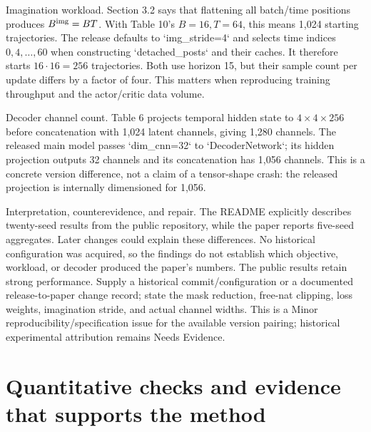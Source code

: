 \documentclass[10pt]{article}
\begin{document}
Imagination workload. Section 3.2 says that flattening all batch/time positions produces \(B^{\rm img}=BT\). With Table 10’s \(B=16,T=64\), this means 1,024 starting trajectories. The release defaults to `img\_stride=4` and selects time indices \(0,4,\ldots,60\) when constructing `detached\_posts` and their caches. It therefore starts \(16\cdot16=256\) trajectories. Both use horizon 15, but their sample count per update differs by a factor of four. This matters when reproducing training throughput and the actor/critic data volume.\par
Decoder channel count. Table 6 projects temporal hidden state to \(4\times4\times256\) before concatenation with 1,024 latent channels, giving 1,280 channels. The released main model passes `dim\_cnn=32` to `DecoderNetwork`; its hidden projection outputs 32 channels and its concatenation has 1,056 channels. This is a concrete version difference, not a claim of a tensor-shape crash: the released projection is internally dimensioned for 1,056.\par
Interpretation, counterevidence, and repair. The README explicitly describes twenty-seed results from the public repository, while the paper reports five-seed aggregates. Later changes could explain these differences. No historical configuration was acquired, so the findings do not establish which objective, workload, or decoder produced the paper’s numbers. The public results retain strong performance. Supply a historical commit/configuration or a documented release-to-paper change record; state the mask reduction, free-nat clipping, loss weights, imagination stride, and actual channel widths. This is a Minor reproducibility/specification issue for the available version pairing; historical experimental attribution remains Needs Evidence.\par
\section*{Quantitative checks and evidence that supports the method}
\end{document}
